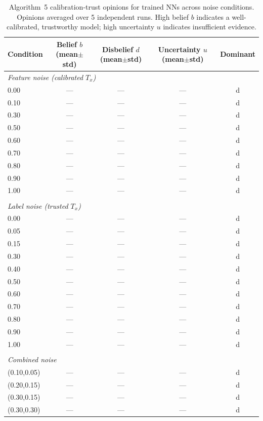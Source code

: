 \begin{table}[ht]
\centering
\caption{Algorithm~5 calibration-trust opinions for trained NNs across noise conditions. Opinions averaged over 5 independent runs. High belief $b$ indicates a well-calibrated, trustworthy model; high uncertainty $u$ indicates insufficient evidence.}
\label{tab:calibration-trust}
\begin{tabular}{lcccc}
\toprule
Condition & Belief $b$ (mean$\pm$std) & Disbelief $d$ (mean$\pm$std) & Uncertainty $u$ (mean$\pm$std) & Dominant \\
\midrule
\multicolumn{5}{l}{\textit{Feature noise (calibrated $T_x$)}} \\
0.00 & — & — & — & d \\
0.10 & — & — & — & d \\
0.30 & — & — & — & d \\
0.50 & — & — & — & d \\
0.60 & — & — & — & d \\
0.70 & — & — & — & d \\
0.80 & — & — & — & d \\
0.90 & — & — & — & d \\
1.00 & — & — & — & d \\
\midrule \\
\multicolumn{5}{l}{\textit{Label noise (trusted $T_x$)}} \\
0.00 & — & — & — & d \\
0.05 & — & — & — & d \\
0.15 & — & — & — & d \\
0.30 & — & — & — & d \\
0.40 & — & — & — & d \\
0.50 & — & — & — & d \\
0.60 & — & — & — & d \\
0.70 & — & — & — & d \\
0.80 & — & — & — & d \\
0.90 & — & — & — & d \\
1.00 & — & — & — & d \\
\midrule \\
\multicolumn{5}{l}{\textit{Combined noise}} \\
(0.10,0.05) & — & — & — & d \\
(0.20,0.15) & — & — & — & d \\
(0.30,0.15) & — & — & — & d \\
(0.30,0.30) & — & — & — & d \\
\bottomrule
\end{tabular}
\end{table}